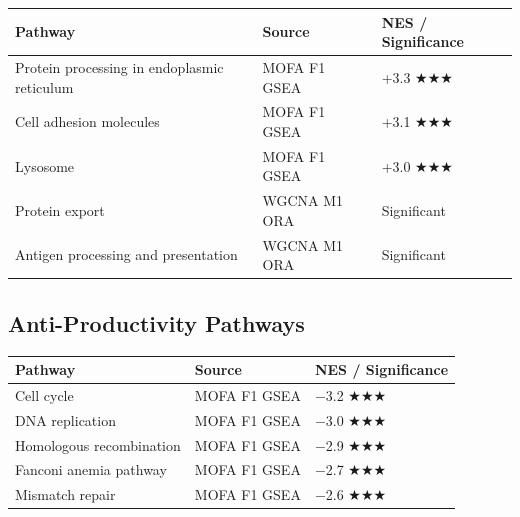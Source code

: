 \documentclass[
  letterpaper,
  oneside,
  open=any]{scrbook}
\newcounter{none} %
\begin{document}
{\def\LTcaptype{none} %
\begin{longtable}[]{@{}
  >{\raggedright\arraybackslash}p{}
  >{\raggedright\arraybackslash}p{}
  >{\raggedright\arraybackslash}p{}@{}}
\toprule\noalign{}
\begin{minipage}[b]{\linewidth}\raggedright
Pathway
\end{minipage} & \begin{minipage}[b]{\linewidth}\raggedright
Source
\end{minipage} & \begin{minipage}[b]{\linewidth}\raggedright
NES / Significance
\end{minipage} \\
\midrule\noalign{}
\endhead
\bottomrule\noalign{}
\endlastfoot
Protein processing in endoplasmic reticulum & MOFA F1 GSEA & +3.3 ★★★ \\
Cell adhesion molecules & MOFA F1 GSEA & +3.1 ★★★ \\
Lysosome & MOFA F1 GSEA & +3.0 ★★★ \\
Protein export & WGCNA M1 ORA & Significant \\
Antigen processing and presentation & WGCNA M1 ORA & Significant \\
\end{longtable}
}

\subsection{Anti-Productivity
Pathways}\label{anti-productivity-pathways}

{\def\LTcaptype{none} %
\begin{longtable}[]{@{}lll@{}}
\toprule\noalign{}
Pathway & Source & NES / Significance \\
\midrule\noalign{}
\endhead
\bottomrule\noalign{}
\endlastfoot
Cell cycle & MOFA F1 GSEA & −3.2 ★★★ \\
DNA replication & MOFA F1 GSEA & −3.0 ★★★ \\
Homologous recombination & MOFA F1 GSEA & −2.9 ★★★ \\
Fanconi anemia pathway & MOFA F1 GSEA & −2.7 ★★★ \\
Mismatch repair & MOFA F1 GSEA & −2.6 ★★★ \\
\end{longtable}
}
\end{document}
